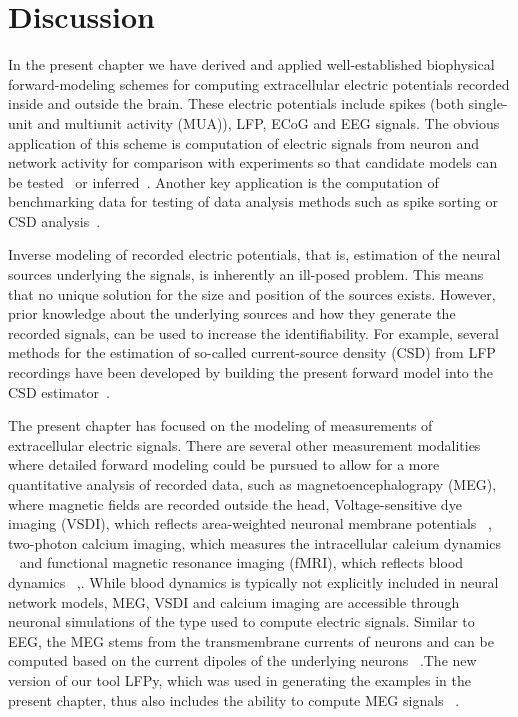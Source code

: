 \documentclass[preprint,11pt,authoryear]{elsarticle}
\begin{document}
\section{Discussion}
\label{sec:summary}

In the present chapter we have derived and applied well-established biophysical forward-modeling schemes for computing extracellular electric potentials recorded inside and outside the brain. These electric potentials include spikes (both single-unit and multiunit activity (MUA)), LFP, ECoG and EEG signals. The obvious application of this scheme is computation of electric signals from neuron and network activity for comparison with experiments so that candidate models can be tested~\citep{Einevoll2019} or inferred~\citep{Goncalves2019,Skaar2020}.
Another key application is the computation of benchmarking data for testing of data analysis methods such as 
spike sorting or CSD analysis~\citep{Denker2012}. 

Inverse modeling of recorded electric potentials, that is, estimation of the neural sources underlying the signals, is inherently an ill-posed problem. This means that no unique solution for the size and position of the sources exists. However, prior knowledge about the underlying sources and how they generate the recorded signals, can be used to increase the identifiability. For example, several methods for the estimation of so-called current-source density (CSD) from LFP recordings have been developed by building the present forward model into the CSD 
estimator~\citep{Pettersen2006,Potworowski2012,Cserpan2017}.

The present chapter has focused on the modeling of measurements of extracellular electric signals. There are several other measurement modalities where detailed forward modeling could be pursued to allow for a more quantitative analysis of recorded data, such as magnetoencephalograpy (MEG), where magnetic fields are recorded outside the head, Voltage-sensitive dye imaging (VSDI), which reflects area-weighted neuronal membrane potentials ~\citep{Chemla2012}, two-photon calcium imaging, which measures the intracellular calcium dynamics ~\citep{Helmchen2012} and functional magnetic resonance imaging (fMRI), which reflects blood dynamics ~\citep{Bartels2012},. While blood dynamics is typically not explicitly included in neural network models, MEG, VSDI and calcium imaging are accessible through neuronal simulations of the type used to compute electric signals. Similar to EEG, the MEG stems from the transmembrane currents of neurons and can be computed based on the current dipoles of the underlying neurons ~\citep{Hamalainen1993,Ilmoniemi2019}.The new version of our tool LFPy, which was used in generating the examples in the present chapter, thus also includes the ability to compute MEG signals ~\citep{Hagen2018}.
 
\end{document}
